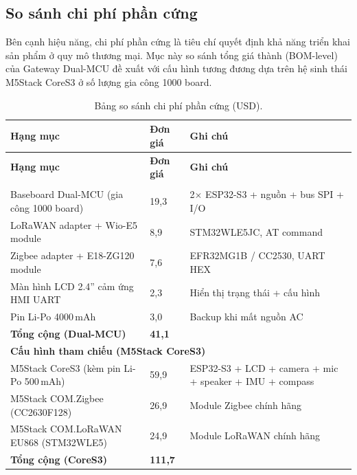         \subsection{So sánh chi phí phần cứng}
        \label{subsec:cost_compare}
        
        Bên cạnh hiệu năng, chi phí phần cứng là tiêu chí quyết định khả năng triển khai sản phẩm ở quy mô thương mại. Mục này so sánh tổng giá thành (BOM-level) của Gateway Dual-MCU đề xuất với cấu hình tương đương dựa trên hệ sinh thái M5Stack CoreS3 ở số lượng gia công 1000 board.
        
        \begin{longtable}{|p{6cm}|p{2.5cm}|p{6cm}|}
            \caption{Bảng so sánh chi phí phần cứng (USD).} \label{tab:cost_compare} \\
            \hline
            \textbf{Hạng mục} & \textbf{Đơn giá} & \textbf{Ghi chú} \\ \hline
            \endfirsthead
            \hline
            \textbf{Hạng mục} & \textbf{Đơn giá} & \textbf{Ghi chú} \\ \hline
            \endhead
            \hline
            \endfoot
            \endlastfoot
            \multicolumn{3}{|l|}{\textbf{Sản phẩm đồ án (Dual-MCU)}} \\ \hline
            Baseboard Dual-MCU (gia công 1000 board) & 19{,}3 & 2$\times$ ESP32-S3 + nguồn + bus SPI + I/O \\ \hline
            LoRaWAN adapter + Wio-E5 module & 8{,}9 & STM32WLE5JC, AT command \\ \hline
            Zigbee adapter + E18-ZG120 module & 7{,}6 & EFR32MG1B / CC2530, UART HEX \\ \hline
            Màn hình LCD 2.4'' cảm ứng HMI UART & 2{,}3 & Hiển thị trạng thái + cấu hình \\ \hline
            Pin Li-Po 4000\,mAh & 3{,}0 & Backup khi mất nguồn AC \\ \hline
            \textbf{Tổng cộng (Dual-MCU)} & \textbf{41{,}1} & \\ \hline
            \multicolumn{3}{|l|}{\textbf{Cấu hình tham chiếu (M5Stack CoreS3)}} \\ \hline
            M5Stack CoreS3 (kèm pin Li-Po 500\,mAh) & 59{,}9 & ESP32-S3 + LCD + camera + mic + speaker + IMU + compass \\ \hline
            M5Stack COM.Zigbee (CC2630F128) & 26{,}9 & Module Zigbee chính hãng \\ \hline
            M5Stack COM.LoRaWAN EU868 (STM32WLE5) & 24{,}9 & Module LoRaWAN chính hãng \\ \hline
            \textbf{Tổng cộng (CoreS3)} & \textbf{111{,}7} & \\ \hline
        \end{longtable}
        
